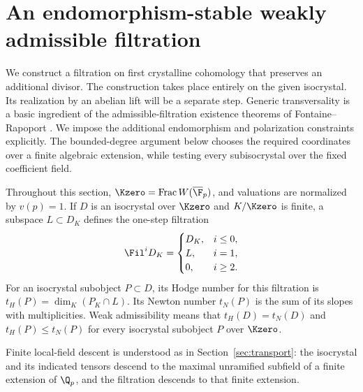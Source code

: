 \section{An endomorphism-stable weakly admissible filtration}
\label{sec:filtration}

We construct a filtration on first crystalline cohomology that preserves an
additional divisor.  The construction takes place entirely on the given
isocrystal.  Its realization by an abelian lift will be a separate step.
Generic transversality is a basic ingredient of the admissible-filtration
existence theorems of Fontaine--Rapoport
\cite[Theorem~1 and Lemmas~1.1--1.2]{FontaineRapoport2005}.
We impose the additional endomorphism and polarization constraints
explicitly. The bounded-degree argument below chooses the required
coordinates over a finite algebraic extension, while testing every
subisocrystal over the fixed coefficient field.

Throughout this section, $\Kzero=\operatorname{Frac}W(\overline{\F}_p)$,
and valuations are normalized by $v(p)=1$.  If $D$ is an isocrystal over
$\Kzero$ and $K/\Kzero$ is finite, a subspace $L\subset D_K$ defines the
one-step filtration
\[
 \Fil^iD_K=
 \begin{cases}
 D_K,&i\leq 0,\\
 L,&i=1,\\
 0,&i\geq 2.
 \end{cases}
\]
For an isocrystal subobject $P\subset D$, its Hodge number for this
filtration is $t_H(P)=\dim_K(P_K\cap L)$.  Its Newton number $t_N(P)$ is
the sum of its slopes with multiplicities.  Weak admissibility means that
$t_H(D)=t_N(D)$ and $t_H(P)\leq t_N(P)$ for every isocrystal subobject
$P$ over $\Kzero$.

Finite local-field descent is understood as in Section~\ref{sec:transport}:
the isocrystal and its indicated tensors descend to the maximal unramified
subfield of a finite extension of \(\Q_p\), and the filtration descends
to that finite extension.

